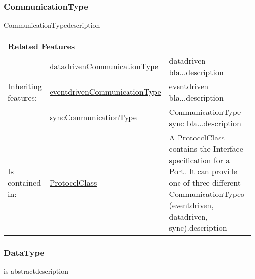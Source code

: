 			
		
		\subsubsection{CommunicationType}
			\hypertarget{ref:CommunicationType}{}
			
			CommunicationTypedescription
			
			
			
			\vspace{\baselineskip}
			\begingroup
			\renewcommand{\arraystretch}{1.8} %
			\parbox{\textwidth}{
			\begin{longtable}{l l p{}}
				\multicolumn{2}{l}{\textbf{\large Related Features}} & \\
				\hline
			\multirow{3}{*}{Inheriting features:} & \tabitem \hyperlink{ref:datadrivenCommunicationType}{datadrivenCommunicationType}  & datadriven bla...description\\
			& \tabitem \hyperlink{ref:eventdrivenCommunicationType}{eventdrivenCommunicationType}  & eventdriven bla...description \\
			& \tabitem \hyperlink{ref:syncCommunicationType}{syncCommunicationType}  & CommunicationType sync bla...description  \\
			\hline
			Is contained in: & \tabitem \hyperlink{ref:ProtocolClass}{ProtocolClass}  & A ProtocolClass contains the Interface specification for a Port. It can provide one of three different CommunicationTypes (eventdriven, datadriven, sync).description \\
			\hline
			\end{longtable}	
			}
			\endgroup
			\vspace{\baselineskip}
			
			
		
		\subsubsection{DataType}
			\hypertarget{ref:DataType}{}
			
			is abstractdescription
			
			
			
